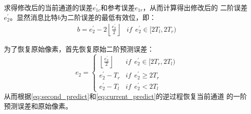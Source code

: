 求得修改后的当前通道的误差$e_{1c}^{'}$和参考误差$e_{1r}$，从而计算得出修改后的
二阶误差$e_2^{'}$。显然消息比特$b$为二阶误差的最低有效位，即：
\begin{equation}
  \begin{array}{ll}
    \displaystyle b=e_2^{'}-2\left\lfloor\frac{e_2^{'}}{2}\right\rfloor & 
    if~~e_2^{'}\in[2T_l,2T_r)
  \end{array}
  \label{eq:data_extraction}
\end{equation}
\par
为了恢复原始像素，首先恢复原始二阶预测误差：
\begin{equation}
  e_2=\left\{ \begin{array}{ll}
    \displaystyle \left\lfloor\frac{e_2^{'}}{2}\right\rfloor &
    if~~e_2^{'} \in [2T_r,2T_l)\\
    e_2^{'}-T_r & if~~e_2^{'} \ge 2T_r\\
    e_2^{'}-T_l & if~~e_2^{'}<2T_l
  \end{array} \right.
  \label{eq:second_pe_restoration}
\end{equation}
从而根据\ref{eq:second_predict}和\ref{eq:current_predict}的逆过程恢复当前通道
的一阶预测误差和原始像素。





